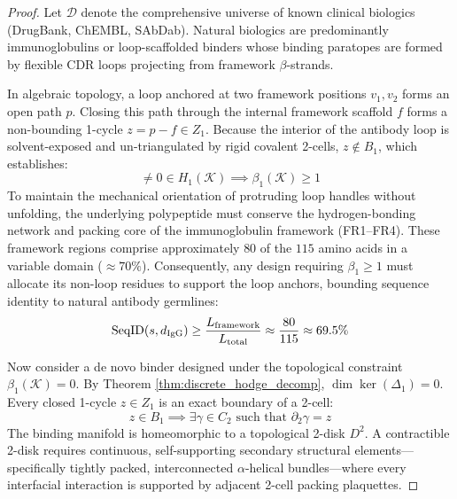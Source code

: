\begin{proof}
Let $\mathcal{D}$ denote the comprehensive universe of known clinical biologics (DrugBank, ChEMBL, SAbDab). Natural biologics are predominantly immunoglobulins or loop-scaffolded binders whose binding paratopes are formed by flexible CDR loops projecting from framework $\beta$-strands. 

In algebraic topology, a loop anchored at two framework positions $v_1, v_2$ forms an open path $p$. Closing this path through the internal framework scaffold $f$ forms a non-bounding 1-cycle $z = p - f \in Z_1$. Because the interior of the antibody loop is solvent-exposed and un-triangulated by rigid covalent 2-cells, $z \notin B_1$, which establishes:
\begin{equation}
    [z] \ne 0 \in H_1(\mathcal{K}) \implies \beta_1(\mathcal{K}) \ge 1
\end{equation}
To maintain the mechanical orientation of protruding loop handles without unfolding, the underlying polypeptide must conserve the hydrogen-bonding network and packing core of the immunoglobulin framework (FR1--FR4). These framework regions comprise approximately $80$ of the $115$ amino acids in a variable domain ($\approx 70\%$). Consequently, any design requiring $\beta_1 \ge 1$ must allocate its non-loop residues to support the loop anchors, bounding sequence identity to natural antibody germlines:
\begin{equation}
    \operatorname{SeqID}(s, d_{\text{IgG}}) \ge \frac{L_{\text{framework}}}{L_{\text{total}}} \approx \frac{80}{115} \approx 69.5\%
\end{equation}

Now consider a de novo binder designed under the topological constraint $\beta_1(\mathcal{K}) = 0$. By Theorem \ref{thm:discrete_hodge_decomp}, $\dim \ker(\Delta_1) = 0$. Every closed 1-cycle $z \in Z_1$ is an exact boundary of a 2-cell:
\begin{equation}
    z \in B_1 \implies \exists \gamma \in C_2 \text{ such that } \partial_2 \gamma = z
\end{equation}
The binding manifold is homeomorphic to a topological 2-disk $D^2$. A contractible 2-disk requires continuous, self-supporting secondary structural elements—specifically tightly packed, interconnected $\alpha$-helical bundles—where every interfacial interaction is supported by adjacent 2-cell packing plaquettes. 


\end{proof}
